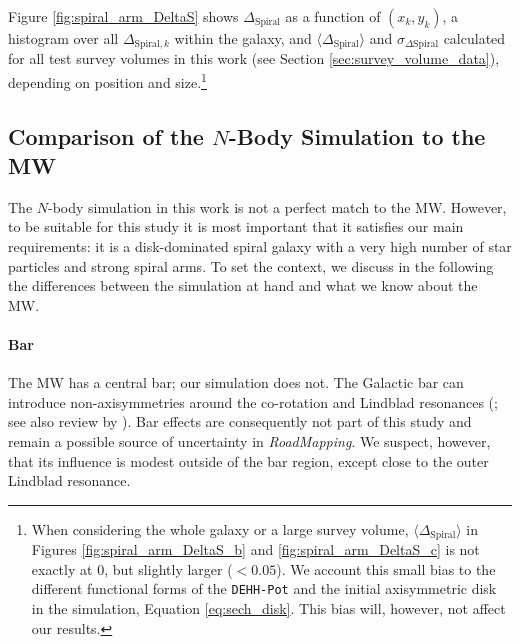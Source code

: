 \documentclass[iop,revtex4,numberedappendix,appendixfloats]{emulateapj}
\newcommand{\RM}{{\sl RoadMapping}}
\begin{document}
Figure \ref{fig:spiral_arm_DeltaS} shows $\Delta_\text{Spiral}$ as a function of $(x_k,y_k)$, a histogram over all $\Delta_{\text{Spiral},k}$ within the galaxy, and $\langle \Delta_\text{Spiral} \rangle$ and $\sigma_{\Delta\text{Spiral}}$ calculated for all test survey volumes in this work (see Section \ref{sec:survey_volume_data}), depending on position and size.\footnote{When considering the whole galaxy or a large survey volume, $\langle \Delta_\text{Spiral} \rangle$ in Figures \ref{fig:spiral_arm_DeltaS_b} and \ref{fig:spiral_arm_DeltaS_c} is not exactly at $0$, but slightly larger ($<0.05$). We account this small bias to the different functional forms of the \texttt{DEHH-Pot} and the initial axisymmetric disk in the simulation, Equation \eqref{eq:sech_disk}. This bias will, however, not affect our results.}

\subsection{Comparison of the $N$-Body Simulation to the MW} \label{sec:comparison_with_MW}

The $N$-body simulation in this work is not a perfect match to the MW. However, to be suitable for this study it is most important that it satisfies our main requirements: it is a disk-dominated spiral galaxy with a very high number of star particles and strong spiral arms. To set the context, we discuss in the following the differences between the simulation at hand and what we know about the MW.

\paragraph{Bar} The MW has a central bar; our simulation does not. The Galactic bar can introduce non-axisymmetries around the co-rotation and Lindblad resonances (\citealt{2000AJ....119..800D,2001A&A...373..511F,2003AJ....125..785Q,2005AJ....130..576Q,2010ApJ...722..112M,2010MNRAS.409..145S,2017MNRAS.466L.113M}; see also review by \citealt{2011MSAIS..18..185G}). Bar effects are consequently not part of this study and remain a possible source of uncertainty in \RM{}. We suspect, however, that its influence is modest outside of the bar region, except close to the outer Lindblad resonance.
\end{document}
